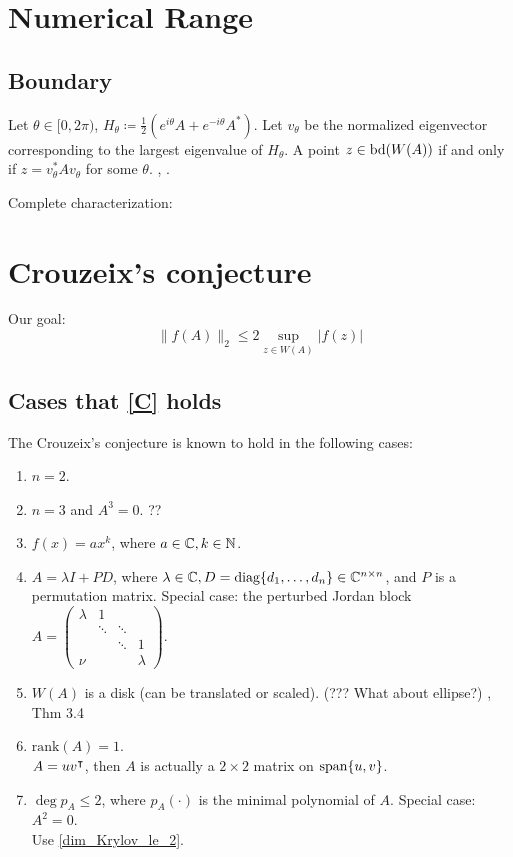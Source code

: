 \documentclass[12pt]{article} %
\begin{document}
\section{Numerical Range}
\subsection{Boundary}
Let $\theta\in [0, 2\pi)$, $H_\theta \coloneq \frac{1}{2}(e^{i\theta}A + e^{-i\theta}A^*)$. Let $v_\theta$ be the normalized eigenvector corresponding to the largest eigenvalue of $H_\theta$. A point $z\in \text{bd}( W(A))$ if and only if $z=v_\theta^* A v_\theta $ for some $\theta$. \cite[Section~3]{Greenbaum2017Crouzeix}, \cite{greenbaum_numerical_2018}.

Complete characterization: 

\section{Crouzeix's conjecture}
Our goal:
\begin{equation}
    \|f(A)\|_2 \le 2 \sup_{z\in W(A)} |f(z)| 
    \label{C}
\end{equation}

\subsection{Cases that \ref{C} holds}
The Crouzeix's conjecture is known to hold in the following cases: 
\begin{enumerate}
    \item $n=2$. \cite{crouzeix_bounds_2004}
    \item $n=3$ and $A^3=0$. ?? \cite{greenbaum_numerical_2018}
    \item   $f(x) = a x^k$, where $a\in \mathbb{C}, k\in \mathbb{N}$.
    \item   $A = \lambda I + PD$, where $\lambda \in \mathbb{C}, D = \text{diag}\{d_1,\dots,d_n\} \in \mathbb{C}^{n\times n}$, and $P$ is a permutation matrix. \cite{glader_crouzeixs_2017} Special case: the perturbed Jordan block $A = \begin{pmatrix}
        \lambda & 1      &        &  \\
                & \ddots & \ddots &  \\
                &        & \ddots & 1 \\
        \nu     &        &        & \lambda
    \end{pmatrix}$. \cite{greenbaum_crouzeixs_2012}
    \item $W(A)$ is a disk (can be translated or scaled). (??? What about ellipse?) \cite{greenbaum_numerical_2018}, \cite{crouzeix_bounds_2004} Thm 3.4
    \item $\text{rank} (A) = 1$. \cite{oloughlin_2023} \\
    \Prf $A=uv^\intercal$, then $A$ is actually a $2\times 2$ matrix on $\text{span}\{u,v\}$. \QED
    \item $\deg p_A \le 2$, where $p_A(\cdot)$ is the minimal polynomial of $A$. Special case: $A^2=0$. \cite{oloughlin_2023} \\
    \Prf Use \ref{dim_Krylov_le_2}. \QED
\end{enumerate}
\end{document}
